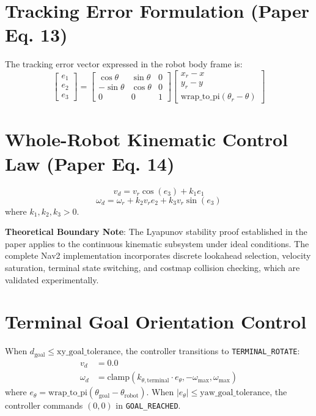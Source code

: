 \documentclass[11pt,a4paper]{article}
\begin{document}
\section{Tracking Error Formulation (Paper Eq. 13)}

The tracking error vector expressed in the robot body frame is:
\begin{equation}
    \begin{bmatrix} e_1 \\ e_2 \\ e_3 \end{bmatrix} =
    \begin{bmatrix} 
        \cos\theta & \sin\theta & 0 \\ 
        -\sin\theta & \cos\theta & 0 \\ 
        0 & 0 & 1 
    \end{bmatrix}
    \begin{bmatrix} 
        x_r - x \\ 
        y_r - y \\ 
        \text{wrap\_to\_pi}(\theta_r - \theta) 
    \end{bmatrix}
\end{equation}

\section{Whole-Robot Kinematic Control Law (Paper Eq. 14)}

\begin{equation}
    \boxed{v_d = v_r \cos(e_3) + k_1 e_1}
\end{equation}
\begin{equation}
    \boxed{\omega_d = \omega_r + k_2 v_r e_2 + k_3 v_r \sin(e_3)}
\end{equation}
where $k_1, k_2, k_3 > 0$. 

\textbf{Theoretical Boundary Note}: The Lyapunov stability proof established in the paper applies to the continuous kinematic subsystem under ideal conditions. The complete Nav2 implementation incorporates discrete lookahead selection, velocity saturation, terminal state switching, and costmap collision checking, which are validated experimentally.

\section{Terminal Goal Orientation Control}

When $d_{\text{goal}} \le \text{xy\_goal\_tolerance}$, the controller transitions to \texttt{TERMINAL\_ROTATE}:
\begin{align}
    v_d &= 0.0 \\
    \omega_d &= \text{clamp}(k_{\theta,\text{terminal}} \cdot e_{\theta}, -\omega_{\text{max}}, \omega_{\text{max}})
\end{align}
where $e_{\theta} = \text{wrap\_to\_pi}(\theta_{\text{goal}} - \theta_{\text{robot}})$. When $|e_{\theta}| \le \text{yaw\_goal\_tolerance}$, the controller commands $(0, 0)$ in \texttt{GOAL\_REACHED}.
\end{document}
